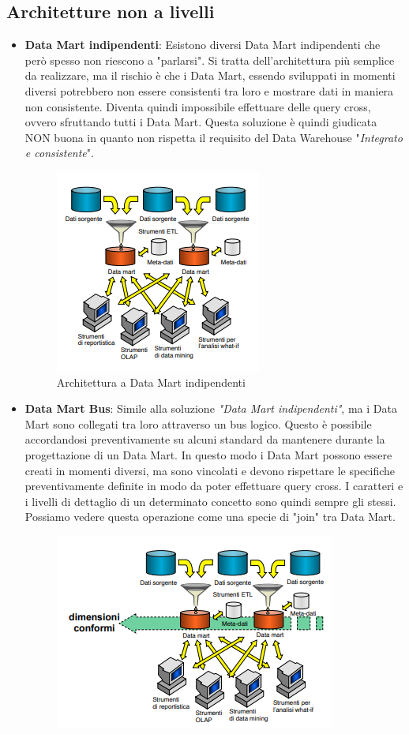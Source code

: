 \subsection{Architetture non a livelli}
\begin{itemize}
	\item \textbf{Data Mart indipendenti}: Esistono diversi Data Mart indipendenti che però spesso non riescono a "parlarsi". Si tratta dell'architettura più semplice da realizzare, ma il rischio è che i Data Mart, essendo sviluppati in momenti diversi potrebbero non essere consistenti tra loro e mostrare dati in maniera non consistente. Diventa quindi impossibile effettuare delle query cross, ovvero sfruttando tutti i Data Mart.\newline
	Questa soluzione è quindi giudicata NON buona in quanto non rispetta il requisito del Data Warehouse "\textit{Integrato e consistente}".
	\begin{figure}[H]
		\begin{center}
			\includegraphics[width=0.4\linewidth]{img/indipendent.PNG}
			\caption{Architettura a Data Mart indipendenti}
		\end{center}
	\end{figure}
	\item \textbf{Data Mart Bus}: Simile alla soluzione \textit{"Data Mart indipendenti"}, ma i Data Mart sono collegati tra loro attraverso un bus logico. Questo è possibile accordandosi preventivamente su alcuni standard da mantenere durante la progettazione di un Data Mart. In questo modo i Data Mart possono essere creati in momenti diversi, ma sono vincolati e devono rispettare le specifiche preventivamente definite in modo da poter effettuare query cross. I caratteri e i livelli di dettaglio di un determinato concetto sono quindi sempre gli stessi. Possiamo vedere questa operazione come una specie di "join" tra Data Mart.
	\begin{figure}[H]
		\begin{center}
			\includegraphics[width=0.5\linewidth]{img/bus.PNG}

\end{center}
\end{figure}
\end{itemize}
